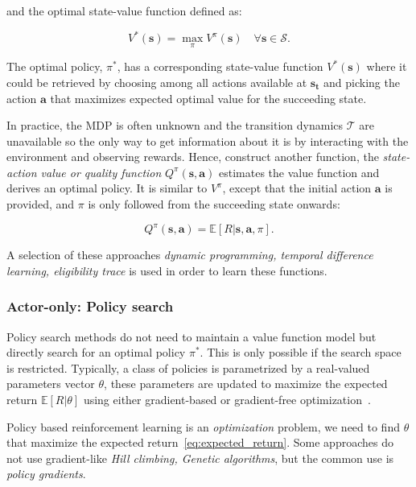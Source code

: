 and the optimal state-value function defined as:
\begin{center}
	        \begin{equation}
	                V^{*}(\mathbf{s})=\max _{\pi} V^{\pi}(\mathbf{s}) \quad \forall \mathbf{s} \in \mathcal{S}.
	        \end{equation}
\end{center}

The optimal policy, $\pi^{*}$, has a corresponding state-value function $V^{*}(\mathbf{s})$ where it could be retrieved by choosing among all actions available at $\mathbf{s_t}$ and picking the action $\mathbf{a}$ that maximizes expected optimal value for the succeeding state.

In practice, the MDP is often unknown and the transition dynamics $\mathcal{T}$ are unavailable so the only way to get information about it is by interacting with the environment and observing rewards.
Hence, construct another function, the \textit{state-action value or quality function} $Q^{\pi}(\mathbf{s}, \mathbf{a})$ estimates the value function and derives an optimal policy. 
It is similar to $V^{\pi}$, except that the initial action $\mathbf{a}$ is provided, and $\pi$ is only followed from the succeeding state onwards:
\begin{center}
	        \begin{equation}
	                Q^{\pi}(\mathbf{s}, \mathbf{a})=\mathbb{E}[R | \mathbf{s}, \mathbf{a}, \pi].
	        \end{equation}
\end{center}

A selection of these approaches \textit{dynamic programming, temporal difference learning, eligibility trace} is used in order to learn these functions.

\subsubsection{Actor-only: Policy search}
Policy search methods do not need to maintain a value function model but directly search for an optimal policy $\pi^{*}$. This is only possible if the search space is restricted. Typically, a class of policies is parametrized by a real-valued parameters vector $\theta$, these parameters are updated to maximize the expected return $\mathbb{E}[R | \theta]$ using either gradient-based or gradient-free optimization~\parencite{deisenroth2013survey}.

Policy based reinforcement learning is an \textit{optimization} problem, we need to find $\theta$ that maximize the expected return~\eqref{eq:expected_return}.
Some approaches do not use gradient-like \textit{Hill climbing, Genetic algorithms}, but the common use is \textit{policy gradients}.


